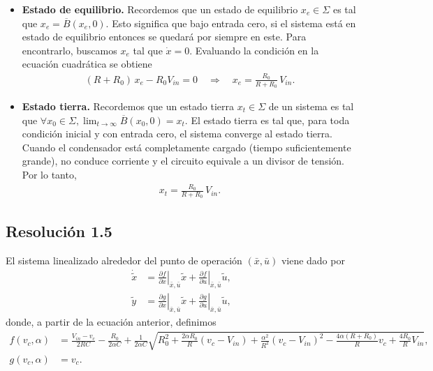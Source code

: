 \documentclass[
  11pt,
  letterpaper,
   addpoints,
   answers
  ]{exam}
\begin{document}
\begin{questions}
\begin{solution}
\begin{itemize}
    \item \textbf{Estado de equilibrio.} Recordemos que un estado de equilibrio \(x_e \in \Sigma\) es tal que \(x_e = \overline{B}(x_e, 0)\). Esto significa que bajo entrada cero, si el sistema está en estado de equilibrio entonces se quedará por siempre en este. Para encontrarlo, buscamos \(x_e\) tal que \(\dot x=0\). Evaluando la condición en la ecuación cuadrática se obtiene
    \begin{align}
    (R+R_0)\,x_e - R_0 V_{in}=0 \quad \Rightarrow \quad
    x_e = \frac{R_0}{R+R_0}\,V_{in}.
    \end{align}
    
    \item \textbf{Estado tierra.} Recordemos que un estado tierra \(x_t \in \Sigma\) de un sistema es tal que \(\forall x_0 \in \Sigma, \lim_{t \to \infty} \overline{B}(x_0, 0) = x_t\). El estado tierra es tal que, para toda condición inicial y con entrada cero, el sistema converge al estado tierra. Cuando el condensador está completamente cargado (tiempo suficientemente grande), no conduce corriente y el circuito equivale a un divisor de tensión. Por lo tanto,
    \begin{align}
    x_t = \frac{R_0}{R+R_0}\,V_{in}.
    \end{align}
\end{itemize}

\subsection*{Resolución 1.5}

El sistema linealizado alrededor del punto de operación \((\bar x,\bar u)\) viene dado por
\begin{align}
\dot{\tilde x} &= \left.\frac{\partial f}{\partial x}\right|_{\bar x,\bar u}\tilde x
               + \left.\frac{\partial f}{\partial u}\right|_{\bar x,\bar u}\tilde u, \\
\tilde y       &= \left.\frac{\partial g}{\partial x}\right|_{\bar x,\bar u}\tilde x
               + \left.\frac{\partial g}{\partial u}\right|_{\bar x,\bar u}\tilde u,
\end{align}
donde, a partir de la ecuación anterior, definimos
\begin{align}
f(v_c,\alpha) &= \frac{V_{in}-v_c}{2RC} - \frac{R_0}{2\alpha C}
+ \frac{1}{2\alpha C}\sqrt{
  R_0^2 + \frac{2\alpha R_0}{R}(v_c - V_{in})
  + \frac{\alpha^2}{R^2}(v_c - V_{in})^2
  - \frac{4\alpha (R+R_0)}{R} v_c + \frac{4R_0}{R}V_{in} }, \\
g(v_c,\alpha) &= v_c.
\end{align}


\end{solution}
\end{questions}
\end{document}
